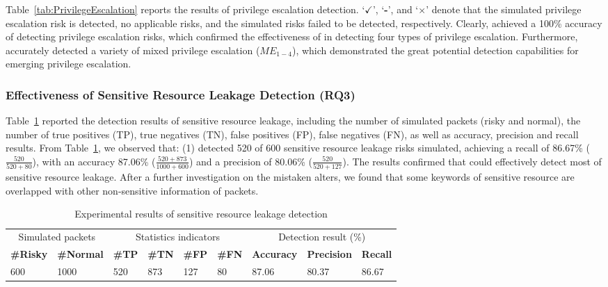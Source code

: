 \documentclass[conference]{IEEEtran}
\theoremstyle{definition}
\begin{document}
Table~\ref{tab:PrivilegeEscalation} reports the results of privilege escalation detection. `$\checkmark$', `\textbf{-}', and `$\times$' denote that the simulated privilege escalation risk is detected, no applicable risks, and the simulated risks failed to be detected, respectively. Clearly, \kg achieved a 100\% accuracy of detecting privilege escalation risks, which confirmed the effectiveness of \kg in detecting four types of privilege escalation. Furthermore, \kg accurately detected a variety of mixed privilege escalation ($ME_{1-4}$), which demonstrated the great potential detection capabilities for emerging privilege escalation. 


\subsubsection{Effectiveness of Sensitive Resource Leakage Detection (RQ3)}
\label{ss:RQ3Answer}


Table~\ref{tab:SRLDection} reported the detection results of sensitive resource leakage, including the number of simulated packets (risky and normal), the number of true positives (TP), true negatives (TN), false positives (FP), false negatives (FN), as well as accuracy, precision and recall results. From Table~\ref{tab:SRLDection}, we observed that: (1) \kg detected 520 of 600 sensitive resource leakage risks simulated, achieving a recall of 86.67\% ($\frac{520}{520+80}$), with an accuracy 87.06\% ($\frac{520+873}{1000+600}$) and a precision of 80.06\% ($\frac{520}{520+127}$). The results confirmed that \kg could effectively detect most of sensitive resource leakage. After a further investigation on the mistaken alters, we found that some keywords of sensitive resource are overlapped with other non-sensitive information of packets.

\begin{table}[!htb]
    \centering
    \renewcommand{\arraystretch}{1.5} 
    \caption{Experimental results of sensitive resource leakage detection}
    \begin{tabular}{p{0.8cm}p{0.75cm}|p{0.15cm}p{0.20cm}p{0.20cm}p{0.20cm}|p{0.8cm}p{0.8cm}p{0.55cm}}
        \hline
         \multicolumn{2}{c|}{Simulated packets}  & \multicolumn{4}{c|}{Statistics indicators} & \multicolumn{3}{c}{ Detection result (\%)} \\
        \cmidrule(lr){1 -2} \cmidrule(lr){3 - 6} \cmidrule(lr){7 - 9}
        \textbf{\#Risky} & \textbf{\#Normal}  & \textbf{\#TP} & \textbf{\#TN} & \textbf{\#FP} & \textbf{\#FN} & \textbf{Accuracy} & \textbf{Precision} & \textbf{Recall} \\
        \hline
        600 & 1000 & 520 & 873 & 127 & 80  & 87.06 & 80.37 & 86.67 \\
        \hline
    \end{tabular}
    \label{tab:SRLDection}
\end{table}
\end{document}
